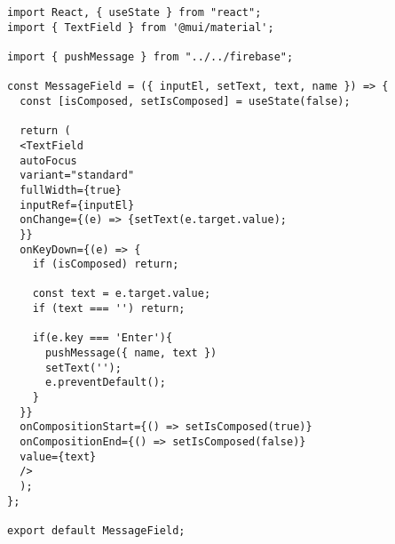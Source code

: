 \begin{verbatim}
import React, { useState } from "react";
import { TextField } from '@mui/material';

import { pushMessage } from "../../firebase";

const MessageField = ({ inputEl, setText, text, name }) => {
  const [isComposed, setIsComposed] = useState(false);

  return (
  <TextField 
  autoFocus
  variant="standard"
  fullWidth={true} 
  inputRef={inputEl}
  onChange={(e) => {setText(e.target.value);
  }}
  onKeyDown={(e) => {
    if (isComposed) return;

    const text = e.target.value;
    if (text === '') return;

    if(e.key === 'Enter'){
      pushMessage({ name, text })
      setText('');
      e.preventDefault();
    }
  }}
  onCompositionStart={() => setIsComposed(true)}
  onCompositionEnd={() => setIsComposed(false)}
  value={text}
  />
  );
};

export default MessageField;
\end{verbatim}